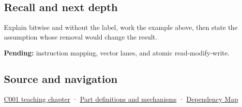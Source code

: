 \subsection{Recall and next depth}\label{appendix-68b52453737c-recall-and-next-depth}

Explain bitwise and without the label, work the example above, then state the assumption whose removal would change the result.

\textbf{Pending:} instruction mapping, vector lanes, and atomic read-modify-write.

\subsection{Source and navigation}\label{appendix-68b52453737c-source-and-navigation}

\hyperref[01-foundations-i-ch001-from-a-signal-to-an-interpretation]{C001 teaching chapter} · \hyperref[appendix-fd090d982a15]{Part definitions and mechanisms} · \hyperref[appendix-4ad47bdd269a]{Dependency Map}
